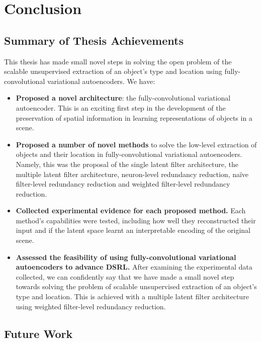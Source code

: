 \chapter{Conclusion}

\label{ch:conclusions}

\section{Summary of Thesis Achievements}

This thesis has made small novel steps in solving the open problem of the scalable unsupervised extraction of an object's type and location using fully-convolutional variational autoencoders. We have:

\begin{itemize}
\item \textbf{Proposed a novel architecture}: the fully-convolutional variational autoencoder. This is an exciting first step in the development of the preservation of spatial information in learning representations of objects in a scene.
\item \textbf{Proposed a number of novel methods} to solve the low-level extraction of objects and their location in fully-convolutional variational autoencoders. Namely, this was the proposal of the single latent filter architecture, the multiple latent filter architecture, neuron-level redundancy reduction, na\"{i}ve filter-level redundancy reduction and weighted filter-level redundancy reduction.
\item \textbf{Collected experimental evidence for each proposed method.} Each method's capabilities were tested, including how well they reconstructed their input and if the latent space learnt an interpretable encoding of the original scene.
\item \textbf{Assessed the feasibility of using fully-convolutional variational autoencoders to advance DSRL.} After examining the experimental data collected, we can confidently say that we have made a small novel step towards solving the problem of scalable unsupervised extraction of an object's type and location. This is achieved with a multiple latent filter architecture using weighted filter-level redundancy reduction.
\end{itemize}


\section{Future Work}

